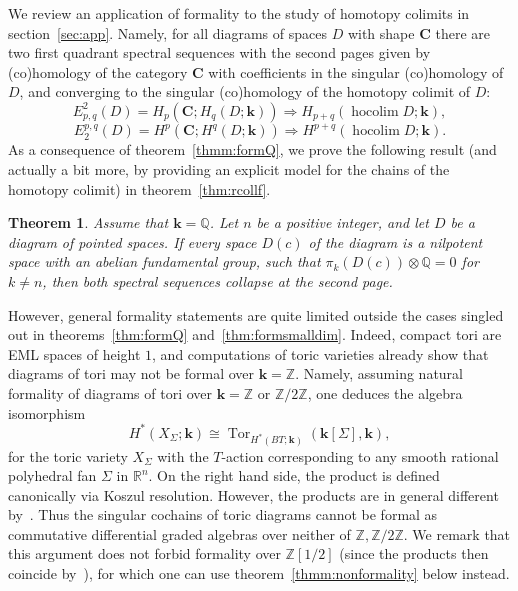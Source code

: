 \documentclass{amsart}
\newcounter{thmMaincounter}
\newtheorem{theoremM}[thmMaincounter]{Theorem}
\theoremstyle{definition}
\theoremstyle{remark}
\newcommand{\Z}{\mathbb Z}
\newcommand{\R}{\mathbb R}
\newcommand{\Q}{\mathbb Q}
\DeclareMathOperator{\Tor}{Tor}
\DeclareMathOperator{\hoc}{hocolim}
\newcommand{\Cc}{\mathbf{C}}
\def\k{\mathbf{k}}
\begin{document}
We review an application of formality to the study of homotopy colimits in section~\ref{sec:app}. Namely, for all diagrams of spaces $D$ with shape $\Cc$ there are two first quadrant spectral sequences with the second pages given by (co)homology of the category $\Cc$ with coefficients in the singular (co)homology of $D$, and converging to the singular (co)homology of the homotopy colimit of $D$:
\[
	E^{2}_{p,q}(D)=H_{p}(\Cc;H_{q}(D;\k))\Rightarrow H_{p+q}(\hoc D;\k),
\]
\[
	E_{2}^{p,q}(D)=H^{p}(\Cc;H^{q}(D;\k))\Rightarrow H^{p+q}(\hoc D;\k).
\]
As a consequence of theorem~\ref{thmm:formQ}, we prove the following result (and actually a bit more, by providing an explicit model for the chains of the homotopy colimit) in theorem~\ref{thm:rcollf}.	

\begin{theoremM}\label{thmm:rcollf}
    Assume that $\k=\Q$. Let $n$ be a positive integer, and let $D$ be a diagram of pointed spaces. If every space $D(c)$ of the diagram is a nilpotent space with an abelian fundamental group, such that $\pi_k(D(c))\otimes\Q=0$ for $k\ne n$, then both spectral sequences collapse at the second page.
\end{theoremM}

However, general  formality statements are quite limited outside the cases singled out in theorems~\ref{thm:formQ} and~\ref{thm:formsmalldim}. 
Indeed, compact tori are EML spaces of height $1$, and computations of toric varieties already show that diagrams of tori may not be formal over $\k=\Z$. Namely, assuming natural formality of diagrams of tori over $\k=\Z$ or $\Z/2\Z$, one deduces the algebra isomorphism~\cite{fr-06}
\[
	H^{*}(X_{\Sigma};\k)\cong \Tor_{H^*(BT;\k)}(\k[\Sigma],\k),
\]
for the toric variety $X_{\Sigma}$ with the $T$-action corresponding to any smooth rational polyhedral fan $\Sigma$ in $\R^{n}$.
On the right hand side, the product is defined canonically via Koszul resolution.
However, the products are in general different by~\cite[Example~1.1]{fr-21}. Thus the singular cochains of toric diagrams cannot be formal as commutative differential graded algebras over neither of $\Z,\Z/2\Z$.
We remark that this argument does not forbid formality over $\Z[1/2]$ (since the products then coincide by~\cite[Theorem~1.2]{fr-21}), for which one can use theorem~\ref{thmm:nonformality} below instead. 
\end{document}
